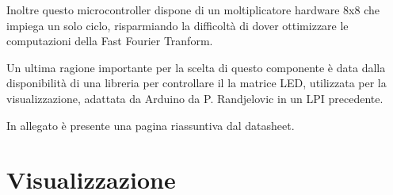 Inoltre questo microcontroller dispone di un moltiplicatore hardware 8x8 che
impiega un solo ciclo, risparmiando la difficolt\`a di dover ottimizzare le
computazioni della Fast Fourier Tranform.

Un ultima ragione importante per la scelta di questo componente \`e data dalla
disponibilit\`a di una libreria per controllare il la matrice LED, utilizzata
per la visualizzazione, adattata da Arduino da P. Randjelovic in un LPI
precedente.

In allegato \`e presente una pagina riassuntiva dal datasheet.

 \section{Visualizzazione}
